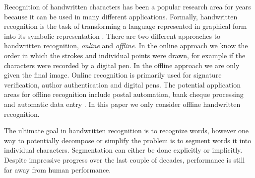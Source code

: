 Recognition of handwritten characters has been a popular research area for years because it can be used in many different applications.
Formally, handwritten recognition is the task of transforming a language represented in graphical form into its symbolic representation \cite{introsurvey}.
There are two different approaches to handwritten recognition, \textit{online} and \textit{offline}.
In the online approach we know the order in which the strokes and individual points were drawn, for example if the characters were recorded by a digital pen.
In the offline approach we are only given the final image.
Online recognition is primarily used for signature verification, author authentication and digital pens.
The potential application areas for offline recognition include postal automation, bank cheque processing and automatic data entry \cite{intro1}.
In this paper we only consider offline handwritten recognition.

The ultimate goal in handwritten recognition is to recognize words, however one way to potentially decompose or simplify the problem is to segment words it into individual characters. \cite{intro-Yacoubi}
Segmentation can either be done explicitly or implicitly.
Despite impressive progress over the last couple of decades, performance is still far away from human performance.
\cite{Cheriet}
